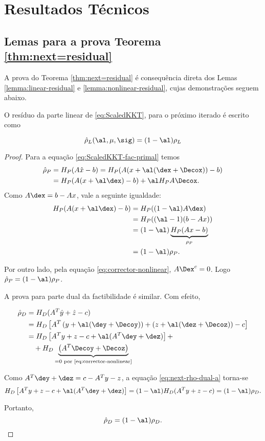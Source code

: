 \chapter{Resultados Técnicos}
\label{sec:tech-resultas}

\section{Lemas para a prova Teorema \ref{thm:next=residual}}
A prova do Teorema \ref{thm:next=residual} é consequência direta  dos  Lemas
\ref{lemma:linear-residual} e \ref{lemma:nonlinear-residual}, cujas
demonstrações seguem abaixo.

\begin{lema}\label{lemma:linear-residual}
O resíduo da parte linear de  \eqref{eq:ScaledKKT}, para o próximo iterado é
escrito como

\[
\hat{\rho}_L(\al,\mu,\sig) = (1-\al)\rho_L
\]
 
\end{lema}

\begin{proof}
Para a equação \eqref{eq:ScaledKKT-fac-primal} temos
\[
\begin{aligned}
\hat{\rho}_P & = H_P(A\hat{x} -b) = H_P(A(x + \al(\dex +
\Decox )) -b) \\ 
			& = H_P(A(x +  \al\dex) - b) +
 \al H_PA\Decox.
\end{aligned}
\]
Como $A\dex = b- Ax$, vale a seguinte igualdade:
\[
\begin{aligned}
H_P(A(x +  \al\dex) - b) & = H_P((1-\al)A\dex) \\
							& = 	 H_P((\al -1)(b-Ax)) \\
							& =  (1 - \al)\underbrace{H_P(Ax - b)}_{\rho_P} 	\\
							& = (1 - \al)\rho_P.					
\end{aligned}
\]


Por outro lado, pela equação \eqref{eq:corrector-nonlinear}, $A\Dex^c= 0$. Logo
$\hat{\rho}_P = (1-\al)\rho_P$.

A prova para parte dual da factibilidade é similar. Com efeito,

\begin{align}
\hat{\rho}_D & = H_D(A^T\hat{y} + \hat{z} -c)   \notag \\
			& = H_D\left[ A^T\left(y + \al(\dey + \Decoy)\right) + \left(z + \al(\dez + \Decoz )\right)
			-c\right] \notag\\
 			& = H_D\left[A^Ty  + z -c +  \al(A^T\dey + \dez)\right] +
 			\label{eq:next-rho-dual-a}\\
 			& \quad + H_D\underbrace{\left(A^T\Decoy   + \Decoz\right)}_{=0 \text{ por
 			\eqref{eq:corrector-nonlinear}}} \notag 
\end{align}

% 
Como $A^T\dey + \dez = c - A^Ty - z$, a equação \eqref{eq:next-rho-dual-a}
torna-se
\[
H_D\left[A^Ty  + z -c +  \al(A^T\dey + \dez)\right]  = (1-\al)H_D 
(A^Ty + z - c)  = (1-\al)\rho_D.
\]

Portanto, 
\[
\hat{\rho}_D = (1-\al)\rho_D .
\]
\end{proof}
 
